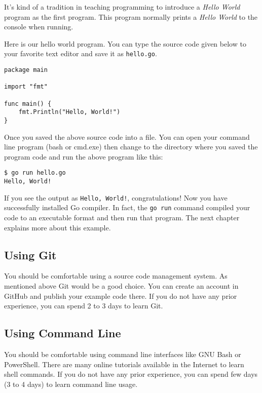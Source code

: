 It's kind of a tradition in teaching programming to introduce a \textit{Hello
World} program as the first program. This program normally prints
a \textit{Hello World} to the console when running.

Here is our hello world program. You can type the source code given below to
your favorite text editor and save it as \texttt{hello.go}.

\begin{lstlisting}[caption=Hello World! (hello.go)]
package main

import "fmt"

func main() {
    fmt.Println("Hello, World!")
}
\end{lstlisting}

Once you saved the above source code into a file. You can open your command line
program (bash or cmd.exe) then change to the directory where you saved the
program code and run the above program like this:

\begin{lstlisting}[numbers=none]
$ go run hello.go
Hello, World!
\end{lstlisting}

If you see the output as \texttt{Hello, World!}, congratulations! Now you have
successfully installed Go compiler. In fact, the \texttt{go run} command
compiled your code to an executable format and then run that program. The next
chapter explains more about this example.

\subsection{Using Git}

You should be comfortable using a source code management system. As mentioned
above Git would be a good choice. You can create an account in GitHub
and publish your example code there. If you do not have any prior experience,
you can spend 2 to 3 days to learn Git.

\subsection{Using Command Line}

You should be comfortable using command line interfaces like
GNU Bash or PowerShell. There are many online tutorials available in the
Internet to learn shell commands. If you do not have any prior experience, you
can spend few days (3 to 4 days) to learn command line usage.

